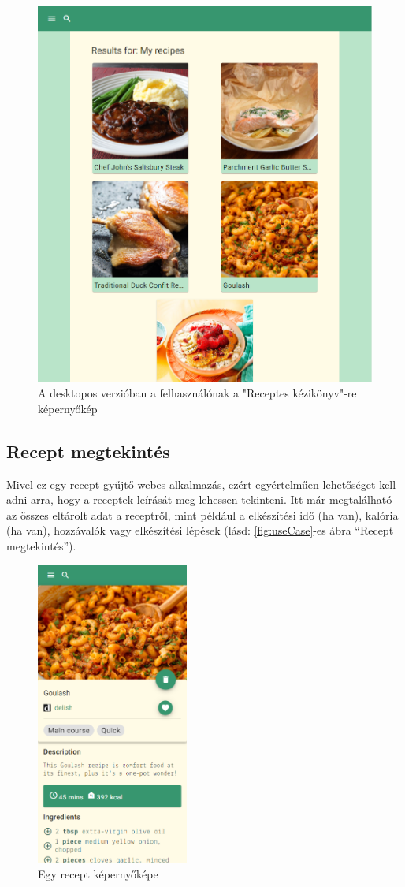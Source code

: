\documentclass[12pt]{report}
\theoremstyle{definition}
\begin{document}
\begin{figure}[H]%
    \centering
    \includegraphics[width=11.5cm]{pictures/web_recipeCollection.png}
	\caption{A desktopos verzióban a felhasználónak a "Receptes kézikönyv"-re képernyőkép}%
    \label{fig:collection}%
\end{figure}


\subsection{Recept megtekintés}
Mivel ez egy recept gyűjtő webes alkalmazás, ezért egyértelműen lehetőséget kell adni arra, hogy a receptek leírását meg lehessen tekinteni. Itt már megtalálható az összes eltárolt adat a receptről, mint például a elkészítési idő (ha van), kalória (ha van), hozzávalók vagy elkészítési lépések (lásd: \ref{fig:useCase}-es ábra “Recept megtekintés”).

\begin{figure}[H]%
    \centering
    \includegraphics[width=5cm]{pictures/mobil_recipe-top.png}
	\caption{Egy recept képernyőképe}%
    \label{fig:recipe}%
\end{figure}
\end{document}
